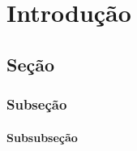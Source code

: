 \chapter{Introdução}%

\lipsum[2]

\section{Seção}%

\lipsum[2]

\lipsum[2]


\subsection{Subseção}%

\lipsum[2]

\lipsum[2]


\subsubsection{Subsubseção}%

\lipsum[3]



\lipsum[2]

